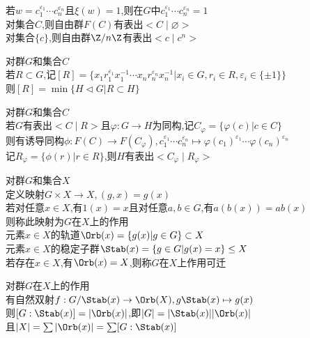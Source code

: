 \begin{zhu}
若$w=c_1^{\varepsilon_1}\cdots c_n^{\varepsilon_n}$且$\xi(w)=1$,则在$G$中$c_1^{\varepsilon_1}\cdots c_n^{\varepsilon_n}=1$\\
对集合$C$,则自由群$F(C)$有表出$<C\mid \varnothing>$\\
对集合$\{c\}$,则自由群$\Z/n\Z$有表出$<c\mid c^n>$
\end{zhu}

\begin{dingli}
对群$G$和集合$C$\\
若$R\subset G$,记$[R]=\{x_1r_1^{\varepsilon_1}x_1^{-1}\cdots x_nr_n^{\varepsilon_n}x_n^{-1}|x_i\in G,r_i\in R,\varepsilon_i\in\{\pm 1\}\}$\\
则$[R]=\min\{H\lhd G|R\subset H\}$
\end{dingli}

\begin{dingli}
对群$G$和集合$C$\\
若$G$有表出$<C\mid R>$且$\varphi:G\to H$为同构,记$C_{\varphi}=\{\varphi(c)|c\in C\}$\\
则有诱导同构$\phi:F(C)\to F(C_{\varphi}),c_1^{\varepsilon_1}\cdots c_n^{\varepsilon_n}\mapsto \varphi(c_1)^{\varepsilon_1}\cdots \varphi(c_n)^{\varepsilon_n}$\\
记$R_{\varphi}=\{\phi(r)|r\in R\}$,则$H$有表出$<C_{\varphi}\mid R_{\varphi}>$
\end{dingli}

\begin{dingyi}
对群$G$和集合$X$\\
定义映射$G\times X\to X,(g,x)=g(x)$\\
若对任意$x\in X$,有$1(x)=x$且对任意$a,b\in G$,有$a(b(x))=ab(x)$\\
则称此映射为$G$在$X$上的作用\\
元素$x\in X$的轨道$\Orb(x)=\{g(x)|g\in G\}\subset X$\\
元素$x\in X$的稳定子群$\Stab(x)=\{g\in G|g(x)=x\}\leq X$\\
若存在$x\in X$,有$\Orb(x)=X$,则称$G$在$X$上作用可迁
\end{dingyi}

\begin{dingli}
对群$G$在$X$上的作用\\
有自然双射$f:G/\Stab(x)\to \Orb(X),g\Stab(x)\mapsto g(x)$\\
则$[G:\Stab(x)]=|\Orb(x)|$,即$|G|=|\Stab(x)||\Orb(x)|$\\
且$|X|=\sum|\Orb(x)|=\sum[G:\Stab(x)]$
\end{dingli}

